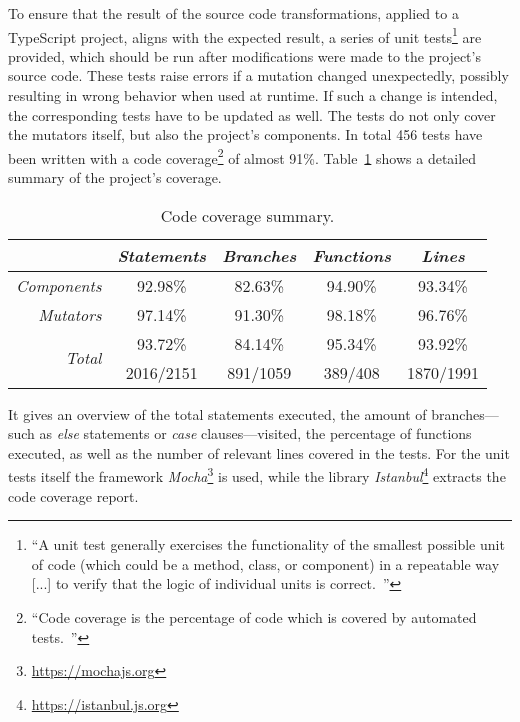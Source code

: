 To ensure that the result of the source code transformations, applied to a TypeScript project, aligns with the expected result, a series of unit tests\footnote{``A unit test generally exercises the functionality of the smallest possible unit of code (which could be a method, class, or component) in a repeatable way~\cite{UnitTests:Android} [...] to verify that the logic of individual units is correct.~\cite{UnitTests:Android}''} are provided, which should be run after modifications were made to the project's source code. These tests raise errors if a mutation changed unexpectedly, possibly resulting in wrong behavior when used at runtime. If such a change is intended, the corresponding tests have to be updated as well. The tests do not only cover the mutators itself, but also the project's components. In total 456 tests have been written with a code coverage\footnote{``Code coverage is the percentage of code which is covered by automated tests.~\cite{CodeCoverage:Atlassian}''} of almost 91\%. Table~\ref{tab:code-coverage} shows a detailed summary of the project's coverage.
\begin{table}
\caption{Code coverage summary.}
\label{tab:code-coverage}
\centering
\setlength{\tabcolsep}{5mm}
\def\arraystretch{1.25}
\small
\begin{tabular}{|r||c|c|c|c|}
    \hline
    & \emph{Statements} & \emph{Branches} & \emph{Functions} & \emph{Lines} \\
    \hline
    \hline
    \emph{Components} & 92.98\% & 82.63\% & 94.90\% & 93.34\% \\
    \hline
    \emph{Mutators} & 97.14\% & 91.30\% & 98.18\% & 96.76\% \\
    \hline
    \hline
    \multicolumn{1}{|r||}{\multirow{2}{*}{\emph{Total}}} & 93.72\% & 84.14\% & 95.34\% & 93.92\% \\
    \cline{2-5}
    \multicolumn{1}{|c||}{} & 2016/2151 & 891/1059 & 389/408 & 1870/1991 \\
    \hline
  \end{tabular}
\end{table}
It gives an overview of the total statements executed, the amount of branches---such as \emph{else} statements or \emph{case} clauses---visited, the percentage of functions executed, as well as the number of relevant lines covered in the tests. For the unit tests itself the framework \emph{Mocha}\footnote{\url{https://mochajs.org}} is used, while the library \emph{Istanbul}\footnote{\url{https://istanbul.js.org}} extracts the code coverage report.

